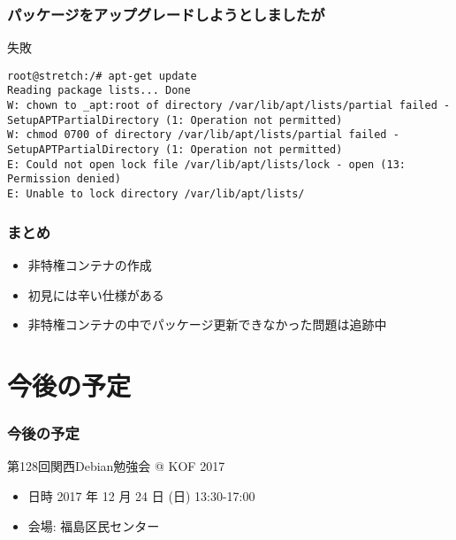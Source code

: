 \documentclass[cjk,dvipdfmx,12pt,compress,%
hyperref={bookmarks=true,bookmarksnumbered=true,bookmarksopen=false,%
colorlinks=false,%
pdftitle={第 120 回 関西 Debian 勉強会},%
pdfauthor={倉敷・のがた・佐々木・かわだ・おおつき},%
pdfsubject={資料},%
}]{beamer}
\begin{document}
\begin{frame}[fragile]
  \frametitle{パッケージをアップグレードしようとしましたが}
  \begin{block}{失敗}
  \begin{verbatim}
root@stretch:/# apt-get update
Reading package lists... Done
W: chown to _apt:root of directory /var/lib/apt/lists/partial failed - SetupAPTPartialDirectory (1: Operation not permitted)
W: chmod 0700 of directory /var/lib/apt/lists/partial failed - SetupAPTPartialDirectory (1: Operation not permitted)
E: Could not open lock file /var/lib/apt/lists/lock - open (13: Permission denied)
E: Unable to lock directory /var/lib/apt/lists/
  \end{verbatim}
  \end{block}
\end{frame}

\begin{frame}[fragile]
  \frametitle{まとめ}
  \begin{block}{}
  \begin{itemize}
   \item 非特権コンテナの作成
   \item 初見には辛い仕様がある
   \item 非特権コンテナの中でパッケージ更新できなかった問題は追跡中
  \end{itemize}
  \end{block}
\end{frame}



\section{今後の予定}
\begin{frame}[fragile]
  \frametitle{今後の予定}
  \begin{block}{第128回関西Debian勉強会 @ KOF 2017}
    \begin{itemize}
    \item 日時 2017 年 12 月 24 日 (日) 13:30-17:00
    \item 会場: 福島区民センター
    \end{itemize}
  \end{block}
\end{frame}
\end{document}
